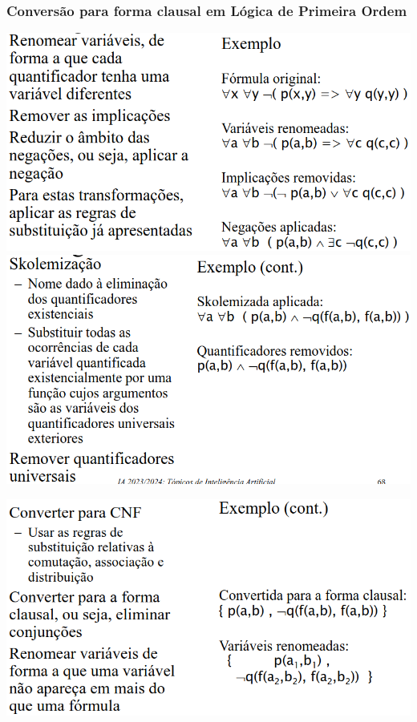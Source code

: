 \documentclass{article}
\begin{document}
\subsubsection{Conversão para forma clausal em
Lógica de Primeira Ordem}

\begin{center}
  \includegraphics[scale=0.25]{32}
  \includegraphics[scale=0.25]{33}

  \vspace{2mm}
  
  \includegraphics[scale=0.3]{34}
\end{center}
\end{document}
